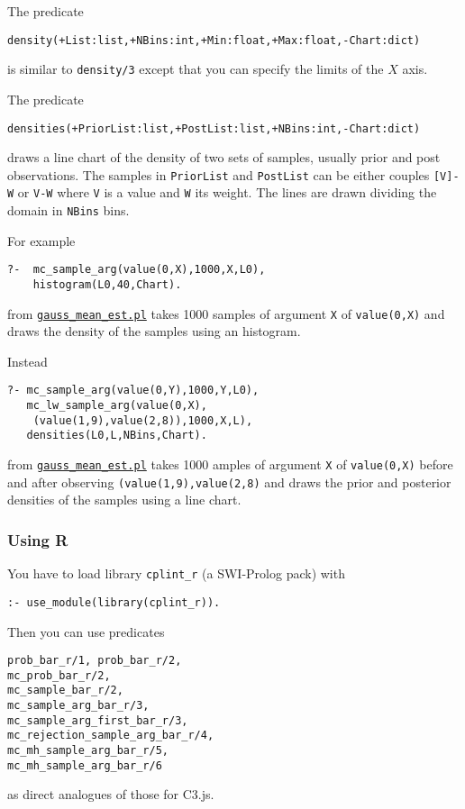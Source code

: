 The predicate
\begin{verbatim}
density(+List:list,+NBins:int,+Min:float,+Max:float,-Chart:dict) 
\end{verbatim}
is similar to \verb|density/3| except that you can specify the limits of the $X$ axis.

The predicate
\begin{verbatim}
densities(+PriorList:list,+PostList:list,+NBins:int,-Chart:dict)
\end{verbatim}
draws a line chart of the density of two sets of samples, usually
 prior and post observations. The samples in \verb|PriorList| and \verb|PostList|
can be either couples \verb|[V]-W| or \verb|V-W| where \verb|V| is a value and \verb|W| its weight.
 The lines are drawn dividing the domain in
 \verb|NBins| bins.
 
For example
\begin{verbatim}
?-  mc_sample_arg(value(0,X),1000,X,L0),
    histogram(L0,40,Chart).
\end{verbatim}
from \href{http://cplint.lamping.unife.it/example/inference/gauss_mean_est.pl}{\texttt{gauss\_mean\_est.pl}}
takes 1000 samples of argument \verb|X| of \verb|value(0,X)| and draws the density of the samples using an histogram.

Instead
\begin{verbatim}
?- mc_sample_arg(value(0,Y),1000,Y,L0),
   mc_lw_sample_arg(value(0,X),
    (value(1,9),value(2,8)),1000,X,L),
   densities(L0,L,NBins,Chart).
\end{verbatim}
from \href{http://cplint.lamping.unife.it/example/inference/gauss_mean_est.pl}{\texttt{gauss\_mean\_est.pl}}
takes 1000 amples of argument \verb|X| of \verb|value(0,X)| before and after observing
\verb|(value(1,9),value(2,8)| and draws the prior and posterior densities of the samples using a line chart.

\subsubsection{Using R}
You have to load library \texttt{cplint\_r}  (a SWI-Prolog pack) with
\begin{verbatim}
:- use_module(library(cplint_r)).
\end{verbatim}
Then you can use predicates 
\begin{verbatim}
prob_bar_r/1, prob_bar_r/2,
mc_prob_bar_r/2,
mc_sample_bar_r/2,
mc_sample_arg_bar_r/3,
mc_sample_arg_first_bar_r/3,
mc_rejection_sample_arg_bar_r/4,
mc_mh_sample_arg_bar_r/5,
mc_mh_sample_arg_bar_r/6
\end{verbatim}
as direct analogues of those for C3.js.

